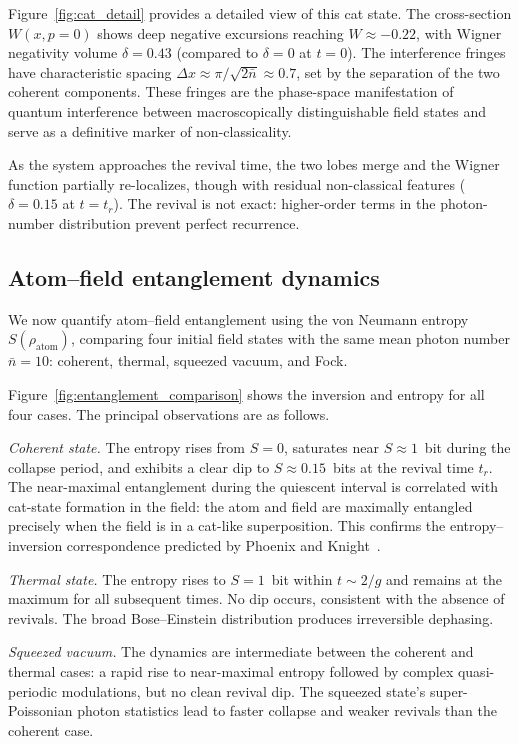 \documentclass[%
 reprint,
 amsmath,amssymb,
 aps,
]{revtex4-2}
\begin{document}
Figure~\ref{fig:cat_detail} provides a detailed view of this cat state. The cross-section $W(x, p = 0)$ shows deep negative excursions reaching $W \approx -0.22$, with Wigner negativity volume $\delta = 0.43$ (compared to $\delta = 0$ at $t = 0$). The interference fringes have characteristic spacing $\Delta x \approx \pi/\sqrt{2\bar{n}} \approx 0.7$, set by the separation of the two coherent components. These fringes are the phase-space manifestation of quantum interference between macroscopically distinguishable field states and serve as a definitive marker of non-classicality.

As the system approaches the revival time, the two lobes merge and the Wigner function partially re-localizes, though with residual non-classical features ($\delta = 0.15$ at $t = t_r$). The revival is not exact: higher-order terms in the photon-number distribution prevent perfect recurrence.


\subsection{Atom--field entanglement dynamics}
\label{sec:entropy_results}

We now quantify atom--field entanglement using the von Neumann entropy $S(\rho_{\text{atom}})$, comparing four initial field states with the same mean photon number $\bar{n} = 10$: coherent, thermal, squeezed vacuum, and Fock.

Figure~\ref{fig:entanglement_comparison} shows the inversion and entropy for all four cases. The principal observations are as follows.

\textit{Coherent state.} The entropy rises from $S = 0$, saturates near $S \approx 1$~bit during the collapse period, and exhibits a clear dip to $S \approx 0.15$~bits at the revival time $t_r$. The near-maximal entanglement during the quiescent interval is correlated with cat-state formation in the field: the atom and field are maximally entangled precisely when the field is in a cat-like superposition. This confirms the entropy--inversion correspondence predicted by Phoenix and Knight~\cite{phoenix1988}.

\textit{Thermal state.} The entropy rises to $S = 1$~bit within $t \sim 2/g$ and remains at the maximum for all subsequent times. No dip occurs, consistent with the absence of revivals. The broad Bose--Einstein distribution produces irreversible dephasing.

\textit{Squeezed vacuum.} The dynamics are intermediate between the coherent and thermal cases: a rapid rise to near-maximal entropy followed by complex quasi-periodic modulations, but no clean revival dip. The squeezed state's super-Poissonian photon statistics lead to faster collapse and weaker revivals than the coherent case.
\end{document}
